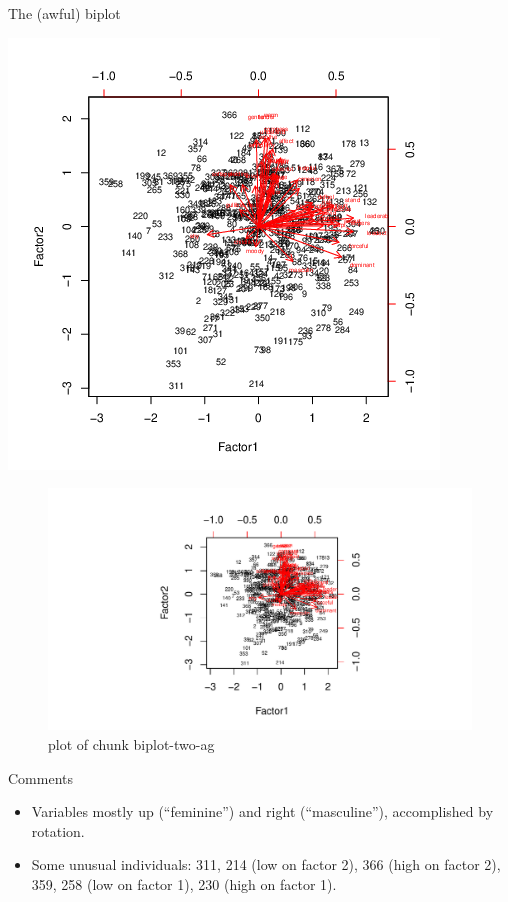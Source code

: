 \documentclass[ignorenonframetext,]{beamer}
\begin{document}
\begin{frame}{The (awful) biplot}
\protect\hypertarget{the-awful-biplot}{}

\includegraphics{bFactor-biplot-two-again.png}

\begin{figure}
\centering
\includegraphics{figure/biplot-two-ag-1.pdf}
\caption{plot of chunk biplot-two-ag}
\end{figure}

\end{frame}

\begin{frame}{Comments}
\protect\hypertarget{comments-33}{}

\begin{itemize}
\item
  Variables mostly up (``feminine'') and right (``masculine''),
  accomplished by rotation.
\item
  Some unusual individuals: 311, 214 (low on factor 2), 366 (high on
  factor 2), 359, 258 (low on factor 1), 230 (high on factor 1).
\end{itemize}

\end{frame}
\end{document}
